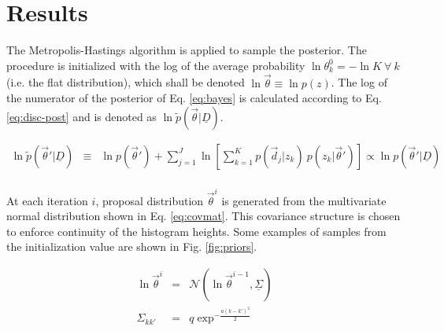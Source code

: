 \documentclass[12pt, onecolumn]{emulateapj}
\newcommand{\textul}{\underline}
\begin{document}
\section{Results}

The Metropolis-Hastings algorithm is applied to sample the posterior.  The procedure is initialized with the log of the average probability $\ln\theta^{0}_{k}=-\ln K\ \forall\ k$ (i.e. the flat distribution), which shall be denoted $\ln\vec{\theta}\equiv\ln p(z)$.  The log of the numerator of the posterior of Eq. \ref{eq:bayes} is calculated according to Eq. \ref{eq:disc-post} and is denoted as $\ln\tilde{p}(\vec{\theta}|\textul{D})$.  

\begin{eqnarray}
\label{eq:disc-post}
\ln\tilde{p}(\vec{\theta}'|\textul{D}) &\equiv& \ln p(\vec{\theta}') + \sum_{j=1}^{J}\ln\left[\sum_{k=1}^{K}p(\vec{d}_{j}|z_{k})\ p(z_{k}|\vec{\theta}')\right] \propto \ln p(\vec{\theta}'|\textul{D})\\
\end{eqnarray}

At each iteration $i$, proposal distribution $\vec{\theta}^{i}$ is generated from the multivariate normal distribution shown in Eq. \ref{eq:covmat}.  This covariance structure is chosen to enforce continuity of the histogram heights.  Some examples of samples from the initialization value are shown in Fig. \ref{fig:priors}.

\begin{mathletters}
\begin{eqnarray}
\label{eq:covmat}
\ln\vec{\theta}^{i} &=& \mathcal{N}(\ln\vec{\theta}^{i-1},\textul{\Sigma})\\
\Sigma_{kk'} &=& q\exp^{-\frac{a(k-k')^{2}}{2}}\nonumber
\end{eqnarray}
\end{mathletters}
\end{document}
